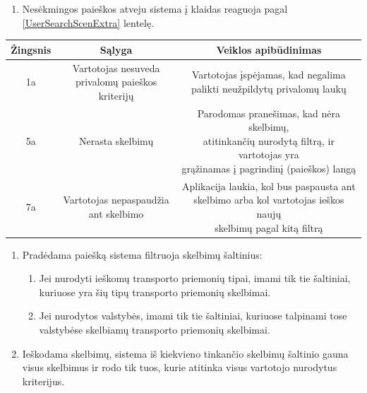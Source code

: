 \documentclass[12pt]{article}
\begin{document}
	\begin{enumerate}[resume,labelindent=10pt,leftmargin=2.2cm]
		\item Nesėkmingos paieškos atveju sistema į klaidas reaguoja pagal \ref{UserSearchScenExtra} lentelę.
	\end{enumerate}

		\begin{center}
		\begin{tabular}{ | c | c | c | }
			\hline
			Žingsnis & Sąlyga & Veiklos apibūdinimas \\ \hline
			1a       & \makecell{Vartotojas nesuveda \\ privalomų paieškos kriterijų} & \makecell{Vartotojas įspėjamas, kad negalima \\ palikti neužpildytų privalomų laukų} \\ \hline
			5a       & Nerasta skelbimų & \makecell{Parodomas pranešimas, kad nėra skelbimų, \\ atitinkančių nurodytą filtrą, ir vartotojas yra \\ grąžinamas į pagrindinį (paieškos) langą } \\ \hline
			7a       & \makecell{Vartotojas nepaspaudžia \\ ant skelbimo} & \makecell{Aplikacija laukia, kol bus paspausta ant \\ skelbimo arba kol vartotojas ieškos naujų \\ skelbimų pagal kitą filtrą} \\ \hline
		\end{tabular}
		\end{center}
		\pagebreak
		
	\begin{enumerate}[resume,labelindent=10pt,leftmargin=2.2cm]
		\item Pradėdama paiešką sistema filtruoja skelbimų šaltinius:
		
		\begin{enumerate}[label=\theenumi.\arabic{enumii}]
			\item Jei nurodyti ieškomų transporto priemonių tipai, imami tik tie šaltiniai, kuriuose yra šių tipų transporto priemonių skelbimai.
			\item Jei nurodytos valstybės, imami tik tie šaltiniai, kuriuose talpinami tose valstybėse skelbiamų transporto priemonių skelbimai.
		\end{enumerate}				
		
		\item Ieškodama skelbimų, sistema iš kiekvieno tinkančio skelbimų šaltinio gauna visus skelbimus ir rodo tik tuos, kurie atitinka visus vartotojo nurodytus kriterijus.
		
	\end{enumerate}
	\pagebreak
	
\end{document}
